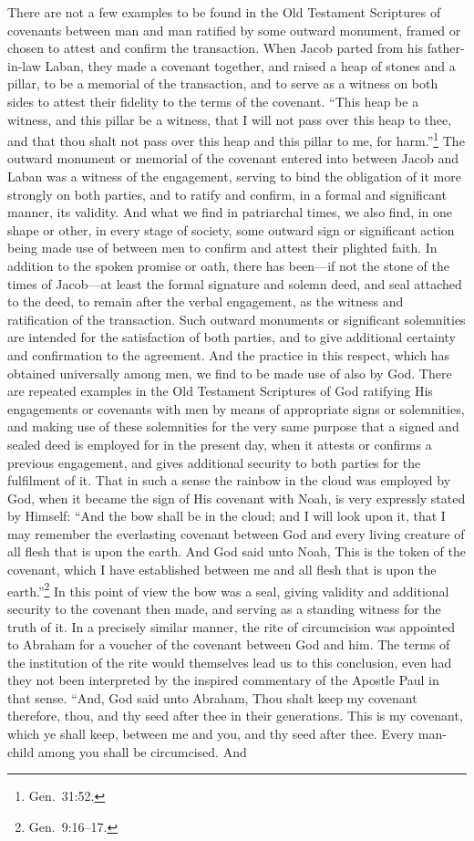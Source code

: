 \documentclass[
  english,
]{book}
\begin{document}
There are not a few examples to be found in the Old Testament Scriptures of covenants between man and man ratified by some outward monument, framed or chosen to attest and confirm the transaction. When Jacob parted from his father-in-law Laban, they made a covenant together, and raised a heap of stones and a pillar, to be a memorial of the transaction, and to serve as a witness on both sides to attest their fidelity to the terms of the covenant. ``This heap be a witness, and this pillar be a witness, that I will not pass over this heap to thee, and that thou shalt not pass over this heap and this pillar to me, for harm.''\footnote{Gen.~31:52.} The outward monument or memorial of the covenant entered into between Jacob and Laban was a witness of the engagement, serving to bind the obligation of it more strongly on both parties, and to ratify and confirm, in a formal and significant manner, its validity. And what we find in patriarchal times, we also find, in one shape or other, in every stage of society, some outward sign or significant action being made use of between men to confirm and attest their plighted faith. In addition to the spoken promise or oath, there has been---if not the stone of the times of Jacob---at least the formal signature and solemn deed, and seal attached to the deed, to remain after the verbal engagement, as the witness and ratification of the transaction. Such outward monuments or significant solemnities are intended for the satisfaction of both parties, and to give additional certainty and confirmation to the agreement. And the practice in this respect, which has obtained universally among men, we find to be made use of also by God. There are repeated examples in the Old Testament Scriptures of God ratifying His engagements or covenants with men by means of appropriate signs or solemnities, and making use of these solemnities for the very same purpose that a signed and sealed deed is employed for in the present day, when it attests or confirms a previous engagement, and gives additional security to both parties for the fulfilment of it. That in such a sense the rainbow in the cloud was employed by God, when it became the sign of His covenant with Noah, is very expressly stated by Himself: ``And the bow shall be in the cloud; and I will look upon it, that I may remember the everlasting covenant between God and every living creature of all flesh that is upon the earth. And God said unto Noah, This is the token of the covenant, which I have established between me and all flesh that is upon the earth.''\footnote{Gen.~9:16--17.} In this point of view the bow was a seal, giving validity and additional security to the covenant then made, and serving as a standing witness for the truth of it. In a precisely similar manner, the rite of circumcision was appointed to Abraham for a voucher of the covenant between God and him. The terms of the institution of the rite would themselves lead us to this conclusion, even had they not been interpreted by the inspired commentary of the Apostle Paul in that sense. ``And, God said unto Abraham, Thou shalt keep my covenant therefore, thou, and thy seed after thee in their generations. This is my covenant, which ye shall keep, between me and you, and thy seed after thee. Every man-child among you shall be circumcised. And 
\end{document}
